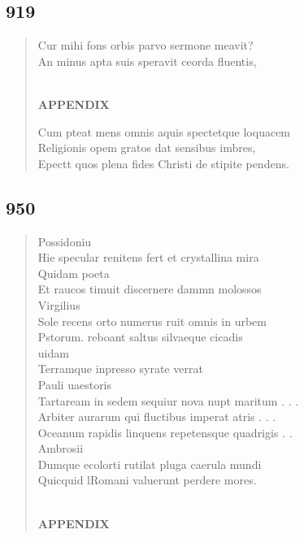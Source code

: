\documentclass[11pt, a4paper]{report}
\begin{document}
            \subsection*{919}
      \begin{verse}
      Cur mihi fons orbis parvo sermone meavit? \\ An minus apta suis speravit ceorda fluentis, \\ 
        ﻿\pagebreak 
    \begin{center} \textbf{APPENDIX} \end{center} \marginpar{[370]} Cum pteat mens omnis aquis spectetque loquacem \\ Religionis opem gratos dat sensibus imbres, \\ Epectt quos plena fides Christi de stipite pendens. \\ 
      \end{verse}
  
            \subsection*{950}
      \begin{verse}
      Possidoniu \\ Hie specular renitens fert et crystallina mira \\ Quidam poeta \\ Et raucos timuit discernere dammn molossos \\ Virgilius \\ Sole recens orto numerus ruit omnis in urbem \\ Pstorum. reboant saltus silvaeque cicadis \\ uidam \\ Terramque inpresso syrate verrat \\ Pauli uaestoris \\ Tartaream in sedem sequiur nova nupt maritum . . . \\ Arbiter aurarum qui fluctibus imperat atris . . . \\ Oceanum rapidis linquens repetensque quadrigis . . \\ Ambrosii \\ Dumque ecolorti rutilat pluga caerula mundi \\ Quicquid lRomani valuerunt perdere mores. \\ 
        ﻿\pagebreak 
    \begin{center} \textbf{APPENDIX} \end{center} \marginpar{[371]} 
      \end{verse}
  
\end{document}
